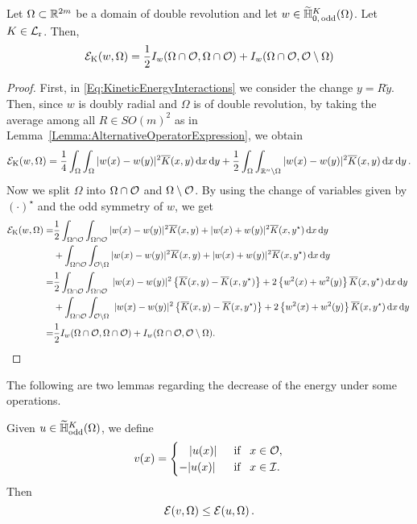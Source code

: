 \begin{lemma}
	\label{Lemma:ShortExpressionEnergy}
Let $\Omega\subset \mathbb{R}^{2m}$ be a domain of double revolution and let $w\in \widetilde{\mathbb{H}}^K_{0,\,
	\mathrm{odd}}(\Omega)$. Let $K \in \mathcal{L}_{\mathrm{r}}$. Then, 
\begin{align*}
\label{Eq:EnergyOddInOcal2}
\mathcal{E}_\mathrm{K}(w, \Omega) = \frac{1}{2} I_w(\Omega\cap\mathcal{O},\Omega\cap\mathcal{O}) + I_w(\Omega\cap\mathcal{O},\mathcal{O}\setminus\Omega)
\end{align*}
\end{lemma}

\begin{proof}
	
	First, in \eqref{Eq:KineticEnergyInteractions} we consider the change $ y = R\tilde{y}$. Then, since $w$ is doubly radial and $\Omega$ is of double revolution, by taking the average among all $R\in SO(m)^2$ as in Lemma~\ref{Lemma:AlternativeOperatorExpression}, we obtain
	$$
	\mathcal{E}_\mathrm{K}(w, \Omega) = \frac{1}{4} \int_{\Omega} \int_{\Omega} |w(x)-w(y)|^2 \overline{K}(x,y) \,\mathrm{d} x \,\mathrm{d} y + \frac{1}{2} \int_{\Omega} \int_{\mathbb{R}^n \setminus \Omega} |w(x)-w(y)|^2 \overline{K}(x,y) \,\mathrm{d} x \,\mathrm{d} y\,.
	$$
	Now we split $\Omega$ into $\Omega \cap \mathcal{O}$ and $\Omega \setminus \mathcal{O}$. By using the change of variables given by $(\cdot)^\star$ and the odd symmetry of $w$, we get	
	\begin{align*}
\ecal_\mathrm{K}(w, \Omega) =  & \frac{1}{2} \int_{\Omega\cap \ocal} \int_{\Omega \cap \ocal} |w(x)-w(y)|^2 \overline{K}(x,y) + |w(x)+w(y)|^2 \overline{K}(x,y^\star) \d x \d y  \\
& + \int_{\Omega\cap \ocal} \int_{\ocal \setminus \Omega} |w(x)-w(y)|^2 \overline{K}(x,y) + |w(x)+w(y)|^2 \overline{K}(x,y^\star) \d x \d y  \\
= & \frac{1}{2} \int_{\Omega\cap \ocal} \int_{\Omega \cap \ocal}  \ |w(x)-w(y)|^2 \left\{ \overline{K}(x,y) - \overline{K}(x,y^\star) \right\}  +2 \left\{w^2(x)+w^2(y)\right\} \overline{K}(x,y^\star) \d x \d y\,\\
&+ \int_{\Omega\cap \ocal} \int_{\ocal \setminus \Omega}  \ |w(x)-w(y)|^2 \left\{ \overline{K}(x,y) - \overline{K}(x,y^\star) \right\}  +2 \left\{w^2(x)+w^2(y)\right\} \overline{K}(x,y^\star) \d x \d y\,\\
= & \frac{1}{2} I_w(\Omega\cap\ocal,\Omega\cap\ocal) + I_w(\Omega\cap\ocal,\ocal\setminus\Omega).
\end{align*}
\end{proof}

The following are two lemmas regarding the decrease of the energy under some operations.
\begin{lemma}
\label{Lemma:TruncationOfFunctions1DecreaseEnergy} Given $u\in
\widetilde{\mathbb{H}}^K_{\mathrm{odd}}(\Omega)$, we define
\begin{equation*}
v(x) = \begin{cases}
\hspace{3.2mm}|u(x)| \,\,\, &\text{if } \,\,\, x\in\mathcal{O},\\
-|u(x)| \,\,\, &\text{if } \,\,\, x\in\mathcal{I}.
\end{cases}
\end{equation*}
Then
$$ \mathcal{E}(v,\Omega) \leq \mathcal{E}(u,\Omega)\,.  $$
\end{lemma}

